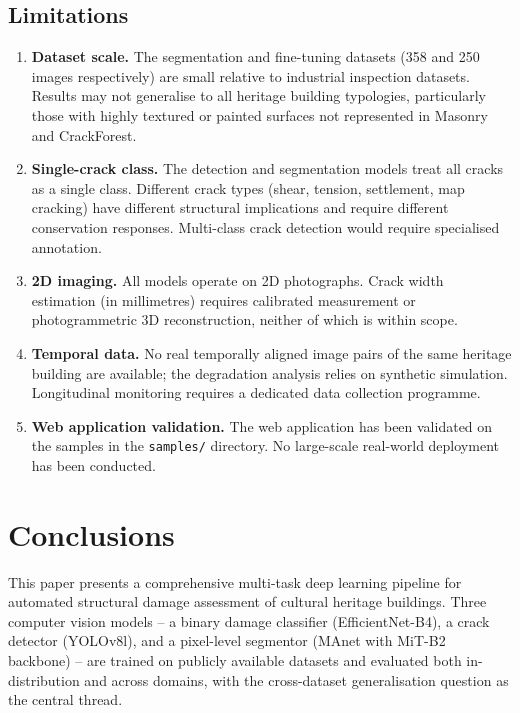 \documentclass[12pt,a4paper]{article}
\begin{document}
\subsection{Limitations}

\begin{enumerate}[leftmargin=1.5cm]
\item \textbf{Dataset scale.} The segmentation and fine-tuning datasets (358 and 250 images respectively) are small relative to industrial inspection datasets. Results may not generalise to all heritage building typologies, particularly those with highly textured or painted surfaces not represented in Masonry and CrackForest.

\item \textbf{Single-crack class.} The detection and segmentation models treat all cracks as a single class. Different crack types (shear, tension, settlement, map cracking) have different structural implications and require different conservation responses. Multi-class crack detection would require specialised annotation.

\item \textbf{2D imaging.} All models operate on 2D photographs. Crack width estimation (in millimetres) requires calibrated measurement or photogrammetric 3D reconstruction, neither of which is within scope.

\item \textbf{Temporal data.} No real temporally aligned image pairs of the same heritage building are available; the degradation analysis relies on synthetic simulation. Longitudinal monitoring requires a dedicated data collection programme.

\item \textbf{Web application validation.} The web application has been validated on the samples in the \texttt{samples/} directory. No large-scale real-world deployment has been conducted.
\end{enumerate}

\section{Conclusions}

This paper presents a comprehensive multi-task deep learning pipeline for automated structural damage assessment of cultural heritage buildings. Three computer vision models -- a binary damage classifier (EfficientNet-B4), a crack detector (YOLOv8l), and a pixel-level segmentor (MAnet with MiT-B2 backbone) -- are trained on publicly available datasets and evaluated both in-distribution and across domains, with the cross-dataset generalisation question as the central thread.
\end{document}
